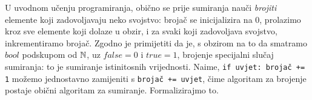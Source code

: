 



U uvodnom učenju programiranja, obično se prije sumiranja nauči \emph{brojiti} elemente koji zadovoljavaju neko svojstvo: brojač se inicijalizira na $0$, prolazimo kroz sve elemente koji dolaze u obzir, i za svaki koji zadovoljava svojstvo, inkrementiramo brojač. Zgodno je primijetiti da je, s obzirom na to da smatramo $bool$ podskupom od ${\mathbb N}$, uz $\mathit{false}=0$ i $\mathit{true}=1$, brojenje specijalni slučaj sumiranja: to je sumiranje istinitosnih vrijednosti. Naime, \texttt{if uvjet:\ brojač += 1} možemo jednostavno zamijeniti s \texttt{brojač += uvjet}, čime algoritam za brojenje postaje obični algoritam za sumiranje. Formalizirajmo to.

